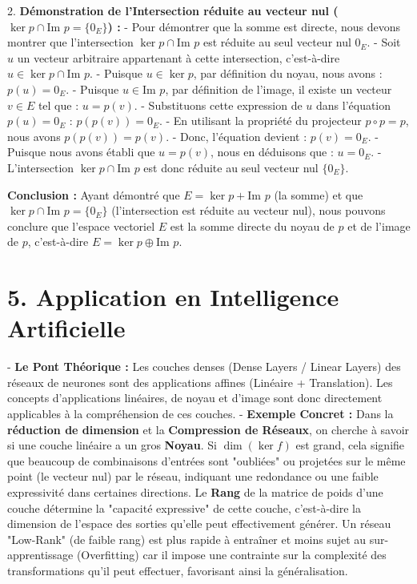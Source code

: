 \documentclass{report}
\begin{document}
2.  \textbf{Démonstration de l'Intersection réduite au vecteur nul ($\ker p \cap \text{Im } p = \{0_E\}$) :}
    -   Pour démontrer que la somme est directe, nous devons montrer que l'intersection $\ker p \cap \text{Im } p$ est réduite au seul vecteur nul $0_E$.
    -   Soit $u$ un vecteur arbitraire appartenant à cette intersection, c'est-à-dire $u \in \ker p \cap \text{Im } p$.
    -   Puisque $u \in \ker p$, par définition du noyau, nous avons :
        $p(u) = 0_E$.
    -   Puisque $u \in \text{Im } p$, par définition de l'image, il existe un vecteur $v \in E$ tel que :
        $u = p(v)$.
    -   Substituons cette expression de $u$ dans l'équation $p(u) = 0_E$ :
        $p(p(v)) = 0_E$.
    -   En utilisant la propriété du projecteur $p \circ p = p$, nous avons $p(p(v)) = p(v)$.
    -   Donc, l'équation devient :
        $p(v) = 0_E$.
    -   Puisque nous avons établi que $u = p(v)$, nous en déduisons que :
        $u = 0_E$.
    -   L'intersection $\ker p \cap \text{Im } p$ est donc réduite au seul vecteur nul $\{0_E\}$.

\textbf{Conclusion :}
Ayant démontré que $E = \ker p + \text{Im } p$ (la somme) et que $\ker p \cap \text{Im } p = \{0_E\}$ (l'intersection est réduite au vecteur nul), nous pouvons conclure que l'espace vectoriel $E$ est la somme directe du noyau de $p$ et de l'image de $p$, c'est-à-dire $E = \ker p \oplus \text{Im } p$.

\section*{5. Application en Intelligence Artificielle}
-   \textbf{Le Pont Théorique :} Les couches denses (Dense Layers / Linear Layers) des réseaux de neurones sont des applications affines (Linéaire + Translation). Les concepts d'applications linéaires, de noyau et d'image sont donc directement applicables à la compréhension de ces couches.
-   \textbf{Exemple Concret :} Dans la \textbf{réduction de dimension} et la \textbf{Compression de Réseaux}, on cherche à savoir si une couche linéaire a un gros \textbf{Noyau}. Si $\dim(\ker f)$ est grand, cela signifie que beaucoup de combinaisons d'entrées sont "oubliées" ou projetées sur le même point (le vecteur nul) par le réseau, indiquant une redondance ou une faible expressivité dans certaines directions. Le \textbf{Rang} de la matrice de poids d'une couche détermine la "capacité expressive" de cette couche, c'est-à-dire la dimension de l'espace des sorties qu'elle peut effectivement générer. Un réseau "Low-Rank" (de faible rang) est plus rapide à entraîner et moins sujet au sur-apprentissage (Overfitting) car il impose une contrainte sur la complexité des transformations qu'il peut effectuer, favorisant ainsi la généralisation.
\end{document}
